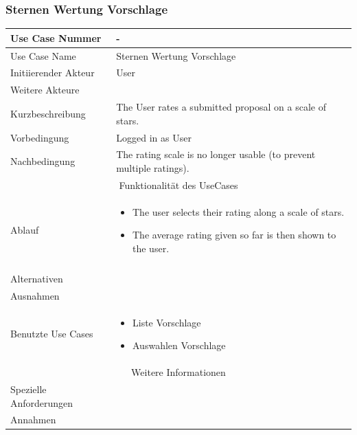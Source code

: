 \documentclass[10pt,a4paper]{article}
\begin{document}
	\subsubsection{Sternen Wertung Vorschlage}
	\begin{tabular}{|l|p{.5\linewidth}|}
	\hline Use Case Nummer & - \\ 
	\hline Use Case Name & Sternen Wertung Vorschlage \\ 
	\hline Initiierender Akteur & User \\
	\hline Weitere Akteure & \\
	\hline Kurzbeschreibung & The User rates a submitted proposal on a scale of stars. \\
	\hline Vorbedingung & Logged in as User \\
	\hline Nachbedingung & The rating scale is no longer usable (to prevent multiple ratings). \\
	\hline \multicolumn{2}{|c|}{Funktionalität des UseCases}\\
	\hline Ablauf & \begin{itemize}
			\item The user selects their rating along a scale of stars.
			\item The average rating given so far is then shown to the user.
		\end{itemize} \\ \\
	\hline Alternativen &  \\
	\hline Ausnahmen &  \\
	\hline Benutzte Use Cases & \begin{itemize}
			\item Liste Vorschlage
			\item Auswahlen Vorschlage
		\end{itemize} \\
	\hline \multicolumn{2}{|c|}{Weitere Informationen} \\
	\hline Spezielle Anforderungen &  \\
	\hline Annahmen &  \\
	\hline
	\end{tabular}
	
\end{document}
